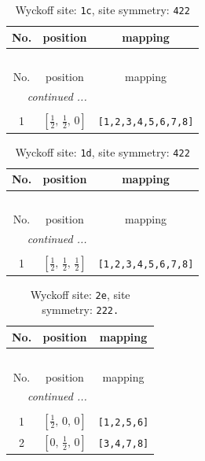 \documentclass[fleqn,8pt]{jsarticle}
\begin{document}
\begin{longtable}{ccc}
\caption{Wyckoff site: {\tt 1c}, site symmetry: {\tt 422}}
 \\
 \hline \hline
No. & position & mapping \\ \hline \endfirsthead

\multicolumn{2}{l}{\tablename\ \thetable{}} \\
 \hline \hline
No. & position & mapping \\ \hline \endhead

 \hline \hline
\multicolumn{2}{r}{\footnotesize\it continued ...} \\ \endfoot

 \hline \hline
\multicolumn{2}{r}{} \\ \endlastfoot

1 & $\left[ \frac{1}{2},\, \frac{1}{2},\, 0 \right]$ & {\tt [1,2,3,4,5,6,7,8]} \\
\end{longtable}
\renewcommand{\arraystretch}{1.2}
\begin{longtable}{ccc}
\caption{Wyckoff site: {\tt 1d}, site symmetry: {\tt 422}}
 \\
 \hline \hline
No. & position & mapping \\ \hline \endfirsthead

\multicolumn{2}{l}{\tablename\ \thetable{}} \\
 \hline \hline
No. & position & mapping \\ \hline \endhead

 \hline \hline
\multicolumn{2}{r}{\footnotesize\it continued ...} \\ \endfoot

 \hline \hline
\multicolumn{2}{r}{} \\ \endlastfoot

1 & $\left[ \frac{1}{2},\, \frac{1}{2},\, \frac{1}{2} \right]$ & {\tt [1,2,3,4,5,6,7,8]} \\
\end{longtable}
\renewcommand{\arraystretch}{1.2}
\begin{longtable}{ccc}
\caption{Wyckoff site: {\tt 2e}, site symmetry: {\tt 222.}}
 \\
 \hline \hline
No. & position & mapping \\ \hline \endfirsthead

\multicolumn{2}{l}{\tablename\ \thetable{}} \\
 \hline \hline
No. & position & mapping \\ \hline \endhead

 \hline \hline
\multicolumn{2}{r}{\footnotesize\it continued ...} \\ \endfoot

 \hline \hline
\multicolumn{2}{r}{} \\ \endlastfoot

1 & $\left[ \frac{1}{2},\, 0,\, 0 \right]$ & {\tt [1,2,5,6]} \\ \hline
2 & $\left[ 0,\, \frac{1}{2},\, 0 \right]$ & {\tt [3,4,7,8]} \\
\end{longtable}
\end{document}
